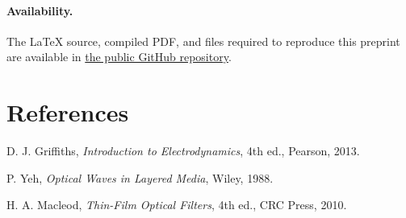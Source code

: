 \documentclass[10pt,a4paper]{article}
\begin{document}
\paragraph{Availability.}
The \LaTeX{} source, compiled PDF, and files required to reproduce this preprint are available in
\href{https://github.com/roldannahuelalejadro/thin-film-tmm-order-invariance}{the public GitHub repository}.

\begin{minipage}{\columnwidth}
\section*{References}
\footnotesize
\begin{enumerate}[label={[\arabic*]},leftmargin=2em,itemsep=0pt,topsep=1pt]
\item D. J. Griffiths, \emph{Introduction to Electrodynamics}, 4th ed., Pearson, 2013.
\item P. Yeh, \emph{Optical Waves in Layered Media}, Wiley, 1988.
\item H. A. Macleod, \emph{Thin-Film Optical Filters}, 4th ed., CRC Press, 2010.
\end{enumerate}
\end{minipage}
\end{document}
